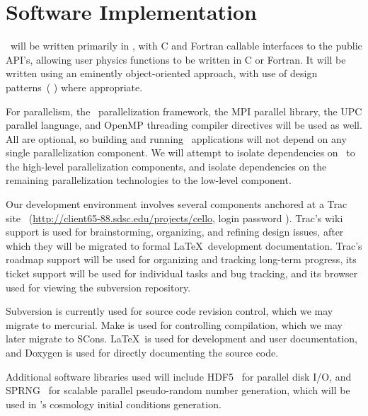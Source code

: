 \documentclass[10pt,twocolumn]{article}
\begin{document}
\section{Software Implementation} \label{s:implementation}

\cello\ will be written primarily in \cpp, with C and Fortran callable
interfaces to the public API's, allowing user physics functions to be
written in C or Fortran.  It will be written using an eminently
object-oriented approach, with use of design patterns~(\cite{GaHe95}
\cite{BuHe07}) where appropriate.

For parallelism, the \charm\  parallelization framework, the MPI
parallel library, the UPC parallel language, and OpenMP threading
compiler directives will be used as well.  All are optional, so
building and running \cello\ applications will not depend on any
single parallelization component.  We will attempt to isolate
dependencies on \charm\  to the high-level parallelization components,
and isolate dependencies on the remaining parallelization technologies
to the low-level  component.

Our development environment involves several components anchored at a
Trac site~\cite{wwwtrac}
(\url{http://client65-88.sdsc.edu/projects/cello}, login 
password ).  Trac's wiki support is used for
brainstorming, organizing, and refining design issues, after which
they will be migrated to formal \LaTeX\ development documentation.
Trac's roadmap support will be used for organizing and tracking
long-term progress, its ticket support will be used for individual
tasks and bug tracking, and its browser used for viewing the
subversion repository.

Subversion is currently used for source code revision control, which
we may migrate to mercurial.  Make is used for controlling
compilation, which we may later migrate to SCons.  \LaTeX\ is used for
development and user documentation, and Doxygen is used for directly
documenting the source code.

Additional software libraries used will include HDF5~\cite{hdf5} for
parallel disk I/O, and SPRNG~\cite{wwwsprng} for scalable parallel
pseudo-random number generation, which will be used in \enzoii's
cosmology initial conditions generation.

\end{document}
